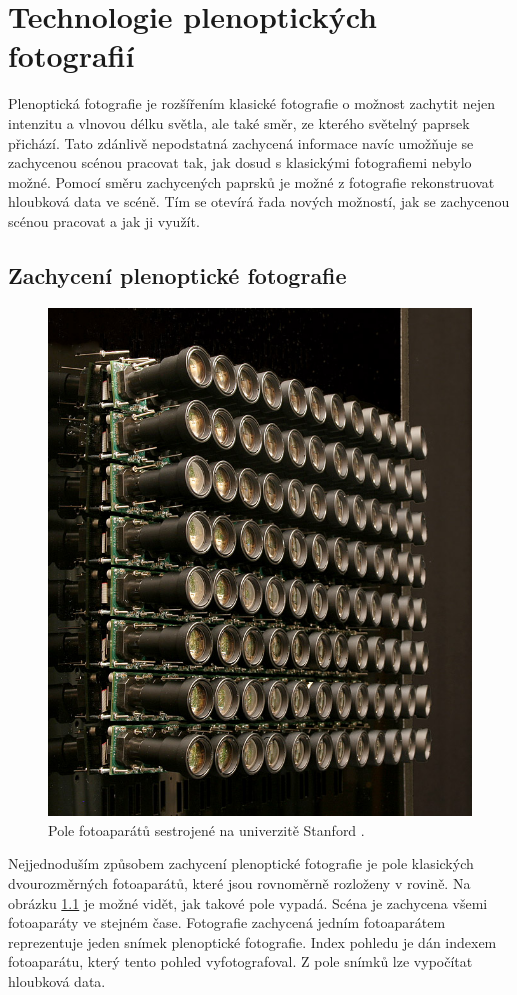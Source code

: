 
\chapter{Technologie plenoptických fotografií}
Plenoptická fotografie je rozšířením klasické fotografie o možnost zachytit nejen intenzitu a vlnovou délku světla, ale také směr, ze kterého světelný paprsek přichází.
Tato zdánlivě nepodstatná zachycená informace navíc umožňuje se zachycenou scénou pracovat tak, jak dosud s klasickými fotografiemi nebylo možné.
Pomocí směru zachycených paprsků je možné z fotografie rekonstruovat hloubková data ve scéně.
Tím se otevírá řada nových možností, jak se zachycenou scénou pracovat a jak ji využít.

\section{Zachycení plenoptické fotografie}
\begin{figure}
  \centering
  \includegraphics[width=.4\textwidth]{obrazky-figures/stanford-array.jpg}
	\caption{Pole fotoaparátů sestrojené na univerzitě Stanford \cite{stanford}.}
	\label{stanfordArray}
\end{figure}

Nejjednoduším způsobem zachycení plenoptické fotografie je pole klasických dvourozměrných fotoaparátů, které jsou rovnoměrně rozloženy v rovině.
Na obrázku \ref{stanfordArray} je možné vidět, jak takové pole vypadá.
Scéna je zachycena všemi fotoaparáty ve stejném čase.
Fotografie zachycená jedním fotoaparátem reprezentuje jeden snímek plenoptické fotografie.
Index pohledu je dán indexem fotoaparátu, který tento pohled vyfotografoval.
Z pole snímků lze vypočítat hloubková data.

